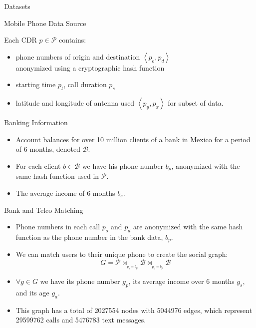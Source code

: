 \documentclass[usenames,dvipsnames]{beamer}
\newcommand{\mathB}{\mathcal{B}}
\newcommand{\mathP}{\mathcal{P}}
\begin{document}
\begin{frame}{Datasets}

\begin{block}{Mobile Phone Data Source}

Each CDR \( p \in \mathP \) contains:
\begin{itemize}
\item phone numbers of origin and destination \( \left< p_o, p_d \right> \) \\
 anonymized using a cryptographic hash function
\item starting time \( p_t \), call duration \( p_s \)
\item latitude and longitude of antenna used \( \left< p_y, p_x \right> \) for subset of data.
\end{itemize} 

\end{block}

\pause

\begin{block}{Banking Information}

\begin{itemize}
\item Account balances for over 10 million clients of a bank in Mexico for a period of 6 months, denoted \( \mathB \). 
\item For each client \( b \in \mathB \) we have his phone number \( b_p \), anonymized with the same hash function used in \( \mathP \).
\item The average income of 6 months \( b_s \).

\end{itemize}


\end{block}

\end{frame}


\begin{frame}{Bank and Telco Matching}

\begin{itemize}

\item Phone numbers in each call $ p_o $ and $ p_d $ are anonymized with the same hash function as the phone number in the bank data, $ b_p $.

\item We can match users to their unique phone to create the social graph:
$$ G = \mathP \bowtie_{_{p_o = b_p}} \mathB \bowtie_{_{p_d = b_p}} \mathB $$

\item \( \forall g \in G \) we have its phone number \( g_p \),  its average income over 6 months \( g_s \), and its age \( g_a \).

\item This graph has a total of \num{2027554} nodes with \num{5044976} edges, which represent \num{29599762} calls and \num{5476783} text messages.
\end{itemize}

\end{frame}
\end{document}
